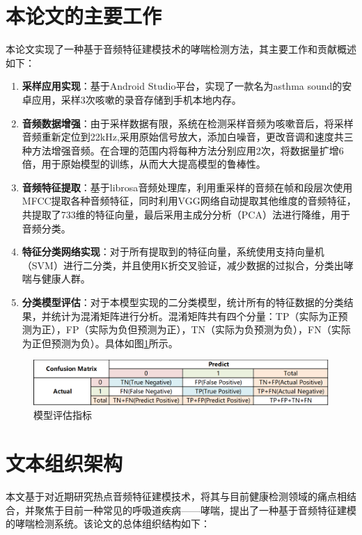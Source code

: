 \section{本论文的主要工作}
本论文实现了一种基于音频特征建模技术的哮喘检测方法，其主要工作和贡献概述如下：
\begin{enumerate}
  \item \textbf{采样应用实现}：基于Android Studio平台，实现了一款名为asthma sound的安卓应用，采样3次咳嗽的录音存储到手机本地内存。
  \item \textbf{音频数据增强}：由于采样数据有限，系统在检测采样音频为咳嗽音后，将采样音频重新定位到22kHz,采用原始信号放大，添加白噪音，更改音调和速度共三种方法增强音频\cite{schluter2015exploring}。在合理的范围内将每种方法分别应用2次，将数据量扩增6倍，用于原始模型的训练，从而大大提高模型的鲁棒性。
  \item \textbf{音频特征提取}：基于librosa\cite{mcfee2015librosa}音频处理库，利用重采样的音频在帧和段层次使用MFCC提取各种音频特征，同时利用VGG网络自动提取其他维度的音频特征，共提取了733维的特征向量，最后采用主成分分析（PCA）法进行降维，用于音频分类。
  \item \textbf{特征分类网络实现}：对于所有提取到的特征向量，系统使用支持向量机（SVM）进行二分类，并且使用K折交叉验证，减少数据的过拟合，分类出哮喘与健康人群。
  \item \textbf{分类模型评估}：对于本模型实现的二分类模型，统计所有的特征数据的分类结果，并统计为混淆矩阵进行分析。混淆矩阵共有四个分量：TP（实际为正预测为正），FP（实际为负但预测为正），TN（实际为负预测为负），FN（实际为正但预测为负）。具体如图\ref{fig:zhibiao}所示。
  
\end{enumerate}
\begin{figure}[h]
  \centering
  \includegraphics[width=\textwidth]{figures/指标.png}
  \caption{模型评估指标}
  \label{fig:zhibiao}
\end{figure}
\section{文本组织架构}
本文基于对近期研究热点音频特征建模技术，将其与目前健康检测领域的痛点相结合，并聚焦于目前一种常见的呼吸道疾病——哮喘，提出了一种基于音频特征建模的哮喘检测系统。该论文的总体组织结构如下：

